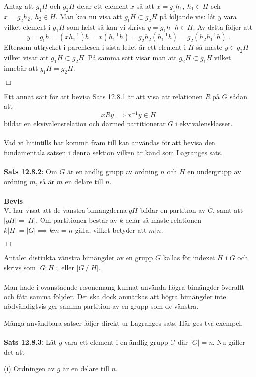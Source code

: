 \documentclass{article}
\begin{document}
Antag att $g_1H$ och $g_2H$ delar ett element $x$ så att $x=g_1h_1, \ h_1\in H$ och $x=g_2h_2, \ h_2\in H$. Man kan nu visa att $g_1H\subset g_2H$ på följande vis: låt $y$ vara vilket element i $g_1H$ som helst så kan vi skriva $y=g_1h, \ h\in H$. Av detta följer att
$$
y=g_1h=(xh_1^{-1})h=x(h_1^{-1}h)=g_2h_2(h_1^{-1}h)=g_2(h_2h_1^{-1}h) \ .
$$
Eftersom uttrycket i parentesen i sista ledet är ett element i $H$ så måste $y\in g_2H$ vilket visar att $g_1H\subset g_2H$. På samma sätt visar man att $g_2H\subset g_1H$ vilket innebär att $g_1H=g_2H$.
\begin{flushright}
$\Box$
\end{flushright}
Ett annat sätt för att bevisa Sats 12.8.1 är att visa att relationen $R$ på $G$ sådan att
$$
xRy \implies x^{-1}y\in H
$$
bildar en ekvivalensrelation och därmed partitionerar $G$ i ekvivalensklasser.\\ \\ 
Vad vi hitintills har kommit fram till kan användas för att bevisa den fundamentala satsen i denna sektion vilken är känd som Lagranges sats. \\ \\
\textbf{Sats 12.8.2:} Om $G$ är en ändlig grupp av ordning $n$ och $H$ en undergrupp av ordning $m$, så är $m$ en delare till $n$.\\ \\
\textbf{Bevis}\\
Vi har visat att de vänstra bimängderna $gH$ bildar en partition av $G$, samt att $|gH|=|H|$. Om partitionen består av $k$ delar så måste relationen $k|H|=|G|\implies km=n$ gälla, vilket betyder att $m|n$.
\begin{flushright}
$\Box$
\end{flushright}
Antalet distinkta vänstra bimängder av en grupp $G$ kallas för indexet $H$ i $G$ och skrivs som $|G:H|;$ eller $|G|/|H|$.\\ \\
Man hade i ovanstående resonemang kunnat använda högra bimängder överallt och fått samma följder. Det ska dock anmärkas att högra bimängder inte nödvändigtvis ger samma partition av en grupp som de vänstra.

Många användbara satser följer direkt ur Lagranges sats. Här ges två exempel.\\ \\
\textbf{Sats 12.8.3:} Låt $g$ vara ett element i en ändlig grupp $G$ där $|G|=n$. Nu gäller det att

(i) Ordningen av $g$ är en delare till $n$.
\end{document}
